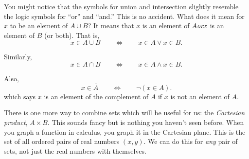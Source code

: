 \documentclass[10pt,]{book}
\theoremstyle{plain}
\theoremstyle{definition}
\theoremstyle{definition}
\theoremstyle{definition}
\def\Iff{\Leftrightarrow}
\begin{document}
      You might notice that the symbols for union and intersection slightly resemble the logic symbols for ``or'' and ``and.'' This is no accident. What does it mean for \(x\) to be an element of \(A\cup B\)? It means that \(x\) is an element
      of \(A\emph{or}x\) is an element of \(B\) (or both). That is,
      \begin{equation*}
        x \in A \cup B \qquad \Iff \qquad x \in A \vee x \in B.
      \end{equation*}
\par

      Similarly,
      \begin{equation*}
        x \in A \cap B \qquad \Iff \qquad x \in A \wedge x \in B.
      \end{equation*}
\par

      Also,
      \begin{equation*}
        x \in \bar A \qquad \Iff \qquad \neg (x \in A).
      \end{equation*}
      which says \(x\) is an element of the complement of \(A\) if \(x\) is not an element of \(A\).
\par

      There is one more way to combine sets which will be useful for us: the \emph{Cartesian product}, \(A \times B\). This sounds fancy but is nothing you haven't seen before. When you graph a function in calculus, you graph it in the Cartesian
      plane. This is the set of all ordered pairs of real numbers \((x,y)\). We can do this for \emph{any} pair of sets, not just the real numbers with themselves.
\par
\end{document}
